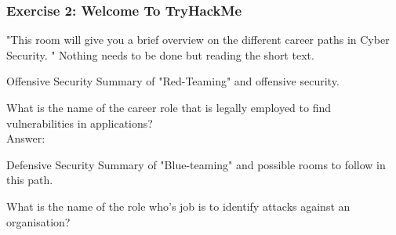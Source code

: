 \subsubsection*{Exercise 2: Welcome To TryHackMe}

\begin{task}
	"This room will give you a brief overview on the different career paths in Cyber Security. "
	Nothing needs to be done but reading the short text.
\end{task}

\begin{task}{Offensive Security}
	Summary of "Red-Teaming" and offensive security.\\
	\begin{flag}
	What is the name of the career role that is legally employed to find vulnerabilities in applications?\\
	Answer: 
	\end{flag}
\end{task}

\begin{task}{Defensive Security}
	Summary of "Blue-teaming" and possible rooms to follow in this path.\\
	\begin{flag}{
What is the name of the role who's job is to identify attacks against an organisation?
}
		\begin{answer} \end{answer}
	\end{flag}
	
\end{task}